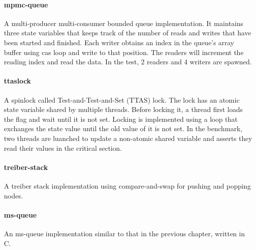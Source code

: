 
\paragraph{mpmc-queue} A multi-producer multi-consumer bounded queue implementation. It maintains three state variables that keeps track of the number of reads and writes that have been started and finished. Each writer obtains an index in the queue's array buffer using cas loop and write to that position. The readers will increment the reading index and read the data. In the test, 2 readers and 4 writers are spawned.



\paragraph{ttaslock} A spinlock called Test-and-Test-and-Set (TTAS) lock. The lock has an atomic state variable shared by multiple threads. Before locking it, a thread first loads the flag and wait until it is not set. Locking is implemented using a loop that exchanges the state value until the old value of it is not set. In the benchmark, two threads are luanched to update a non-atomic shared variable and asserts they read their values in the critical section.

\paragraph{treiber-stack} A treiber stack\cite{treiber-stack} implementation using compare-and-swap for pushing and popping nodes.

\paragraph{ms-queue} An ms-queue implementation similar to that in the previous chapter, written in C.

